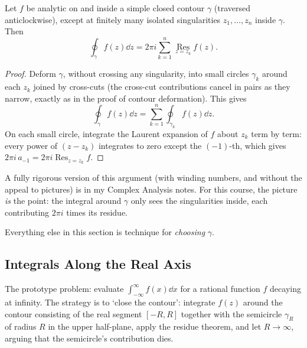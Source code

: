 \documentclass[a4paper]{scrartcl}
\newcommand{\Res}{\operatorname*{Res}}
\begin{document}
\begin{theorem}
	Let $f$ be analytic on and inside a simple closed contour $\gamma$ (traversed anticlockwise), except at finitely many isolated singularities $z_1, \dots, z_n$ inside $\gamma$. Then
	$$
	\oint_\gamma f(z) \dd z = 2\pi i \sum_{k = 1}^n \Res_{z = z_k} f(z).
	$$
\end{theorem}
\begin{proof}
	Deform $\gamma$, without crossing any singularity, into small circles $\gamma_k$ around each $z_k$ joined by cross-cuts (the cross-cut contributions cancel in pairs as they narrow, exactly as in the proof of contour deformation). This gives
	$$
	\oint_\gamma f(z) \dd z = \sum_{k=1}^n \oint_{\gamma_k} f(z) \dd z.
	$$
	On each small circle, integrate the Laurent expansion of $f$ about $z_k$ term by term: every power of $(z - z_k)$ integrates to zero except the $(-1)$-th, which gives $2\pi i \, a_{-1} = 2\pi i \Res_{z = z_k} f$.
\end{proof}

A fully rigorous version of this argument (with winding numbers, and without the appeal to pictures) is in my Complex Analysis notes. For this course, the picture \emph{is} the point: the integral around $\gamma$ only sees the singularities inside, each contributing $2\pi i$ times its residue.

Everything else in this section is technique for \emph{choosing} $\gamma$.

\subsection{Integrals Along the Real Axis}

The prototype problem: evaluate $\int_{-\infty}^\infty f(x) \dd x$ for a rational function $f$ decaying at infinity. The strategy is to `close the contour': integrate $f(z)$ around the contour consisting of the real segment $[-R, R]$ together with the semicircle $\gamma_R$ of radius $R$ in the upper half-plane, apply the residue theorem, and let $R \to \infty$, arguing that the semicircle's contribution dies.

\begin{center}
\end{center}
\end{document}
